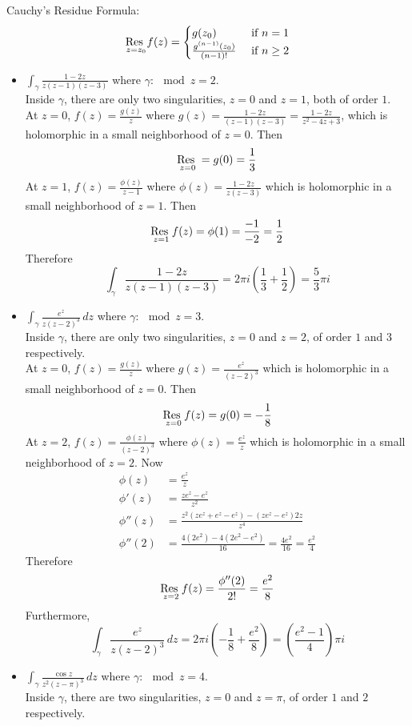 \documentclass[12pt]{article}
\begin{document}
Cauchy's Residue Formula: $$ \underset{z=z_0}{\text{Res }} f(z) = \begin{cases} g(z_0) &\text{ if } n=1 \\ \frac{g^{(n-1)}(z_0)}{(n-1)!} &\text{ if } n \geq 2 \end{cases} $$ 
\begin{itemize} 
\item $\int_\gamma \frac{1-2z}{z(z-1)(z-3)}$ where $\gamma: \mod{z} = 2$. \\
Inside $\gamma$, there are only two singularities, $z=0$ and $z=1$, both of order $1$.  \\
At $z=0$, $f(z) = \frac{g(z)}{z}$ where $g(z) = \frac{1-2z}{(z-1)(z-3)} = \frac{1-2z}{z^2 - 4z + 3}$, which is holomorphic in a small neighborhood of $z = 0$. Then $$ \underset{z=0}{\text{Res }} = g(0) = \frac{1}{3}$$
At $z = 1$, $f(z) = \frac{\phi(z)}{z-1}$ where $\phi(z) = \frac{1-2z}{z(z-3)}$ which is holomorphic in a small neighborhood of $z = 1$. Then $$ \underset{z=1}{\text{Res }} f(z) = \phi(1) = \frac{-1}{-2} = \frac{1}{2}$$
 Therefore $$ \int_\gamma \frac{1-2z}{z(z-1)(z-3)} = 2\pi i(\frac{1}{3} + \frac{1}{2}) = \frac{5}{3}\pi i $$ 
 \item $\int_\gamma \frac{e^z}{z(z-2)^3}\, dz $ where $\gamma: \mod{z} = 3$. \\
 Inside $\gamma$, there are only two singularities, $z=0$ and $z=2$, of order $1$ and $3$ respectively. \\
 At $z=0$, $f(z) = \frac{g(z)}{z}$ where $g(z) = \frac{e^z}{(z-2)^3}$ which is holomorphic in a small neighborhood of $z=0$. Then $$ \underset{z=0}{\text{Res }} f(z) = g(0) = -\frac{1}{8} $$ 
 At $z=2$, $f(z) = \frac{\phi(z)}{(z-2)^3}$ where $\phi(z) = \frac{e^z}{z}$ which is holomorphic in a small neighborhood of $z=2$. Now $$ \begin{aligned} \phi(z) &= \frac{e^z}{z} \\ \phi'(z) &= \frac{ze^z - e^z}{z^2} \\ \phi''(z) &= \frac{z^2(ze^z + e^z - e^z) - (ze^z - e^z)2z}{z^4} \\ \phi''(2) &= \frac{4(2e^2) - 4(2e^2 - e^2)}{16} = \frac{4e^2}{16} = \frac{e^2}{4} \end{aligned} $$ Therefore $$ \underset{z=2}{\text{Res }} f(z) = \frac{\phi''(2)}{2!} = \frac{e^2}{8} $$ Furthermore, $$ \int_\gamma \frac{e^z}{z(z-2)^3}\, dz = 2\pi i (-\frac{1}{8} + \frac{e^2}{8}) = (\frac{e^2 - 1}{4})\pi i  $$ 
 \item $\int_\gamma \frac{\cos z}{z^2(z-\pi)^3} \, dz $ where $\gamma: \mod{z} = 4$. \\ Inside $\gamma$, there are two singularities, $z= 0$ and $z=\pi$, of order $1$ and $2$ respectively. \\

\end{itemize}
\end{document}
